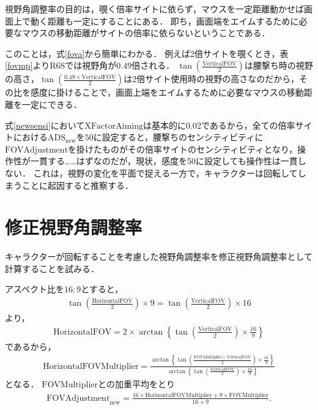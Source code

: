 \documentclass[uplatex, dvipdfmx, ja=standard, a4paper]{bxjsarticle}
\begin{document}
視野角調整率の目的は，覗く倍率サイトに依らず，マウスを一定距離動かせば画面上で動く距離も一定にすることにある．
即ち，画面端をエイムするために必要なマウスの移動距離がサイトの倍率に依らないということである．

このことは，式\eqref{fova}から簡単にわかる．
例えば2倍サイトを覗くとき，表\ref{fovmp}よりR6Sでは視野角が\(0.49\)倍される．
\(\tan \left(\frac{\mathrm{VerticalFOV}}{2}\right)\)は腰撃ち時の視野の高さ，\(\tan \left(\frac{0.49 \times \mathrm{VerticalFOV}}{2}\right)\)は2倍サイト使用時の視野の高さなのだから，その比を感度に掛けることで，画面上端をエイムするために必要なマウスの移動距離を一定にできる．

式\eqref{newsensi}において\(\mathrm{XFactorAiming}\)は基本的に\(0.02\)であるから，全ての倍率サイトにおける\(\mathrm{ADS}_{\mathrm{new}}\)を\(50\)に設定すると，腰撃ちのセンシティビティに\(\mathrm{FOVAdjustment}\)を掛けたものがその倍率サイトのセンシティビティとなり，操作性が一貫する……はずなのだが，現状，感度を50に設定しても操作性は一貫しない．
これは，視野の変化を平面で捉える一方で，キャラクターは回転してしまうことに起因すると推察する．

\section{修正視野角調整率}
キャラクターが回転することを考慮した視野角調整率を修正視野角調整率として計算することを試みる．

アスペクト比を\(16:9\)とすると，
\begin{align}
  \tan \left(\frac{\mathrm{HorizontalFOV}}{2}\right) \times 9 = \tan \left(\frac{\mathrm{VerticalFOV}}{2}\right) \times 16
\end{align}
より，
\begin{align}
  \mathrm{HorizontalFOV} = 2 \times \arctan \left\{\tan \left(\frac{\mathrm{VerticalFOV}}{2}\right) \times \frac{16}{9}\right\}
\end{align}
であるから，
\begin{align}
  \mathrm{HorizontalFOVMultiplier} = \frac{\arctan \left\{\tan \left(\frac{\mathrm{FOVMultiplier} \times \mathrm{VerticalFOV}}{2}\right) \times \frac{16}{9}\right\}}{\arctan \left\{\tan \left(\frac{\mathrm{VerticalFOV}}{2}\right) \times \frac{16}{9}\right\}}
\end{align}
となる．
\(\mathrm{FOVMultiplier}\)との加重平均をとり
\begin{align}
  \mathrm{FOVAdjustment}_{\mathrm{new}} = \frac{16 \times \mathrm{HorizontalFOVMultiplier} + 9 \times \mathrm{FOVMultiplier}}{16 + 9}.
\end{align}
\end{document}
